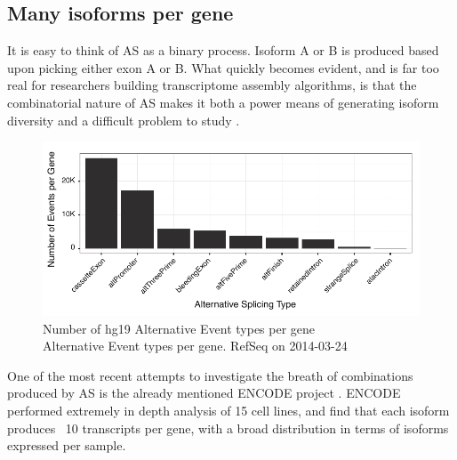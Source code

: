 

\subsection{Many isoforms per gene}\label{sec:IsoformsPerGene}

It is easy to think of AS as a binary process. Isoform A or B is produced based upon picking either exon A or B. What quickly becomes evident, and is far too real for researchers building transcriptome assembly algorithms, is that the combinatorial nature of AS makes it both a power means of generating isoform diversity and a difficult problem to study \citep{Trapnell2012a}.
 
\begin{figure}[htbp]
	\centering 
	\includegraphics{Figures/Chapter1/ASEventTypesPlot.pdf}
	\caption[Number of hg19 Alternative Event types per gene]
	{
		Number of hg19 Alternative Event types per gene\\[0.25cm]
		Alternative Event types per gene. RefSeq on 2014-03-24
	}
	\label{fig:asEventsBarChart}
\end{figure}

One of the most recent attempts to investigate the breath of combinations produced by AS is the already mentioned ENCODE project \citep{Djebali2012}. ENCODE performed extremely in depth analysis of 15 cell lines, and find that each isoform produces ~10 transcripts per gene, with a broad distribution in terms of isoforms expressed per sample. 

